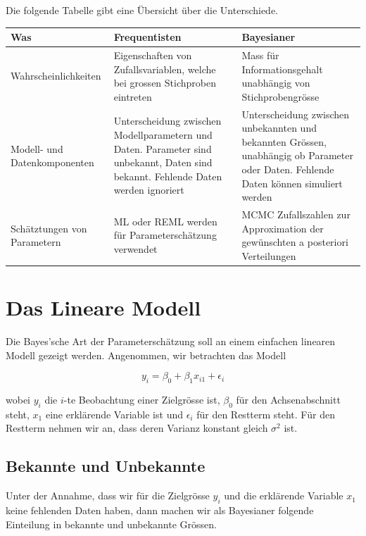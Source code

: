 \documentclass[]{book}
\begin{document}
Die folgende Tabelle gibt eine Übersicht über die Unterschiede.

\begin{tabular}{p{3cm}p{6cm}p{6cm}}
\hline
Was                            &  Frequentisten  &  Bayesianer \\
\hline
Wahrscheinlichkeiten           &  Eigenschaften von Zufallsvariablen, welche bei grossen Stichproben eintreten
                               &  Mass für Informationsgehalt unabhängig von Stichprobengrösse \\
Modell- und Datenkomponenten   &  Unterscheidung zwischen Modellparametern und Daten. Parameter sind unbekannt, Daten sind bekannt. Fehlende Daten werden ignoriert
                               &  Unterscheidung zwischen unbekannten und bekannten Grössen, unabhängig ob Parameter oder Daten. Fehlende Daten können simuliert werden \\
Schätztungen von Parametern    &  ML oder REML werden für Parameterschätzung verwendet
                               &  MCMC Zufallszahlen zur Approximation der gewünschten a posteriori Verteilungen \\
\hline
\end{tabular}

\section{Das Lineare Modell}\label{das-lineare-modell}

Die Bayes'sche Art der Parameterschätzung soll an einem einfachen
linearen Modell gezeigt werden. Angenommen, wir betrachten das Modell

\begin{equation}
y_i = \beta_0 + \beta_1 x_{i1} + \epsilon_i
\label{eq:BayLinMod}
\end{equation}

wobei \(y_i\) die \(i\)-te Beobachtung einer Zielgrösse ist, \(\beta_0\)
für den Achsenabschnitt steht, \(x_1\) eine erklärende Variable ist und
\(\epsilon_i\) für den Restterm steht. Für den Restterm nehmen wir an,
dass deren Varianz konstant gleich \(\sigma^2\) ist.

\subsection{Bekannte und Unbekannte}\label{bekannte-und-unbekannte}

Unter der Annahme, dass wir für die Zielgrösse \(y_i\) und die
erklärende Variable \(x_1\) keine fehlenden Daten haben, dann machen wir
als Bayesianer folgende Einteilung in bekannte und unbekannte Grössen.
\end{document}
